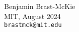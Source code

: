 \begin{flushright}
\textsf{Benjamin Brast-McKie} \\
\textsf{MIT, August 2024} \\
\texttt{brastmck@mit.edu}
\end{flushright}

%
